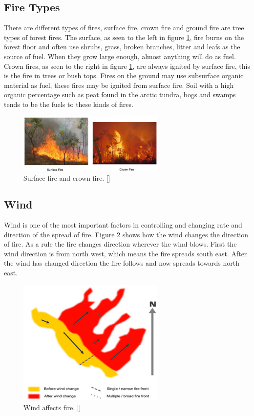 \subsection{Fire Types}
There are different types of fires, surface fire, crown fire and ground fire are tree types of forest fires. The surface, as seen to the left in figure \ref{fig:fire-types}, fire burns on the forest floor and often use shrubs, grass, broken branches, litter and leafs as the source of fuel. When they grow large enough, almost anything will do as fuel. Crown fires, as seen to the right in figure \ref{fig:fire-types}, are always ignited by surface fire, this is the fire in trees or bush tops. Fires on the ground may use subsurface organic material as fuel, these fires may be ignited from surface fire. Soil with a high organic percentage such as peat found in the arctic tundra, bogs and swamps tends to be the fuels to these kinds of fires.
\begin{figure}[here]
  \centering
      \includegraphics[width=0.65\textwidth]{theory/graphics/fire-types.png}
  \caption{Surface fire and crown fire. [] }
  \label{fig:fire-types}
\end{figure}
\subsection{Wind}
Wind is one of the most important factors in controlling and changing rate and direction of the spread of fire. Figure \ref{fig:fire-wind} shows how the wind changes the direction of fire. As a rule the fire changes direction wherever the wind blows. First the wind direction is from north west, which means the fire spreads south east. After the wind has changed direction the fire follows and now spreads towards north east.
\begin{figure}[here]
  \centering
      \includegraphics[width=0.65\textwidth]{theory/graphics/fire-wind.png}
  \caption{Wind affects fire. [] }
  \label{fig:fire-wind}
\end{figure}

